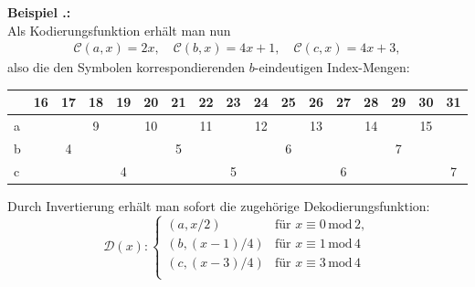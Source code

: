 \documentclass[a4paper,12pt]{article}
\newcommand{\C}{\mathcal C}
\newcommand{\D}{\mathcal D}
\newcounter{Beispiel}
\newenvironment{Beispiel}{
\medskip
        
        \setlength{\parindent}{0pt}
        \addtocounter{Beispiel}{1}
        \textbf{\textsf{Beispiel \thesubsection.\theBeispiel}:}\\}{
        \nopagebreak
        \vspace{-1.0ex}
        \bigskip
        
}
\begin{document}
\begin{Beispiel}
Als Kodierungsfunktion erhält man nun
\begin{align*}
\C(a,x)=2 x,\quad
\C(b,x) = 4 x + 1,\quad
\C(c,x) = 4 x + 3,
\end{align*}
also die den Symbolen korrespondierenden $b$-eindeutigen Index-Mengen:
\par
\vspace{0.5cm}
\begin{center}
 \begin{tabular}{l|c|c|c|c|c|c|c|c|c|c|c|c|c|c|c|c}
 & 16 & 17 & 18 & 19 & 20 & 21 & 22 & 23 & 24 & 25 & 26 & 27 & 28 & 29 & 30 &31\\
\hline
a	& \centering 8 & & 9 & & 10	& & 11 & & 12 & & 13 & & 14 & & 15 &	\\
\hline
b	&  & 4 &  & & 	& 5 &  & &  & 6 &  & &  & 7 & 	\\
\hline
c	&  & &  & 4& 	&  &  &  5&  &  &  & 6 &  &  & & 7 	\\
\end{tabular}
\end{center}
\vspace{0.5cm}
Durch Invertierung erhält man sofort die zugehörige Dekodierungsfunktion:
$$
\D(x):
               \begin{cases}
                 \left(a,x / 2 \right)         & \text{für}\,\, x \equiv 0 \,\text{mod}\, 2,\\
                    \left(b,(x-1)/ 4\right)           & \text{für}\,\, x \equiv 1 \,\text{mod}\, 4\\
									\left(c, (x-3)/ 4 \right)          & \text{für}\,\, x \equiv 3 \,\text{mod}\, 4\\
                \end{cases}
$$


\end{Beispiel}
\end{document}
